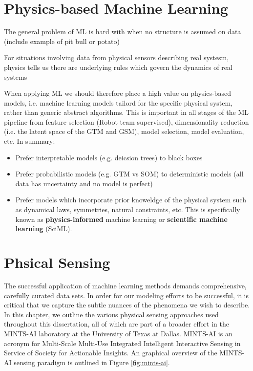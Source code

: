 \section{Physics-based Machine Learning}

The general problem of ML is hard with when no structure is assumed on data (include example of pit bull or potato)

For situations involving data from physical sensors describing real systesm, physics tells us there are underlying rules which govern the dynamics of real systems

When applying ML we should therefore place a high value on physics-based models, i.e. machine learning models tailord for the specific physical system, rather than generic abstract algorithms. This is important in all stages of the ML pipeline from feature selection (Robot team supervised), dimensionality reduction (i.e. the latent space of the GTM and GSM), model selection, model evaluation, etc. In summary:

\begin{itemize}
  \item Prefer interpretable models (e.g. deicsion trees) to black boxes
  \item Prefer probabilistic models (e.g. GTM vs SOM) to deterministic models (all data has uncertainty and no model is perfect)
  \item Prefer models which incorporate prior knoweldge of the physical system such as dynamical laws, symmetries, natural constraints, etc. This is specifically known as \textbf{physics-informed} machine learning or \textbf{scientific machine learning}  (SciML).
\end{itemize}


\section{Phsical Sensing}

The successful application of machine learning methods demands comprehensive, carefully curated data sets. In order for our modeling efforts to be successful, it is critical that we capture the subtle nuances of the phenomena we wish to describe. In this chapter, we outline the various physical sensing approaches used throughout this dissertation, all of which are part of a broader effort in the MINTS-AI laboratory at the University of Texas at Dallas. MINTS-AI is an acronym for Multi-Scale Multi-Use Integrated Intelligent Interactive Sensing in Service of Society for Actionable Insights. An graphical overview of the MINTS-AI sensing paradigm is outlined in Figure \ref{fig:mints-ai}.

